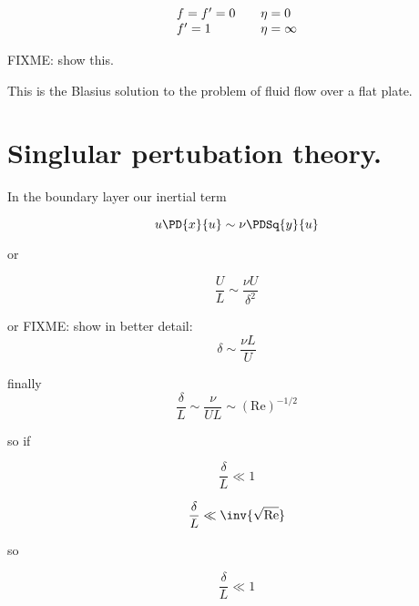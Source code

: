 \begin{equation}\label{eqn:continuumL19:n}
\begin{array}{l l}
f = f' = 0 & \quad \mbox{$\eta = 0$} \\
f' = 1 & \quad \mbox{$\eta = \infty$} \\
\end{array}
\end{equation}

FIXME: show this.

This is the Blasius solution to the problem of fluid flow over a flat plate.

\section{Singlular pertubation theory.}

In the boundary layer our inertial term

\begin{equation}\label{eqn:continuumL19:n}
u \PD{x}{u} \sim \nu \PDSq{y}{u}
\end{equation}

or

\begin{equation}\label{eqn:continuumL19:n}
\frac{U}{L} \sim \frac{\nu U}{\delta^2}
\end{equation}

or
FIXME: show in better detail:
\begin{equation}\label{eqn:continuumL19:n}
\delta  \sim \frac{\nu L}{U}
\end{equation}

finally
\begin{equation}\label{eqn:continuumL19:n}
\frac{\delta}{L} \sim \frac{\nu}{U L} \sim (\text{Re})^{-1/2}
\end{equation}

so if

\begin{equation}\label{eqn:continuumL19:n}
\frac{\delta}{L} \ll 1
\end{equation}

\begin{equation}\label{eqn:continuumL19:n}
\frac{\delta}{L} \ll \inv{\sqrt{\text{Re}}}
\end{equation}

so 

\begin{equation}\label{eqn:continuumL19:n}
\frac{\delta}{L} \ll 1
\end{equation}

